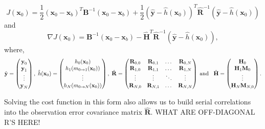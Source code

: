 \documentclass[11pt]{article}
\begin{document}
\begin{equation}
J(\textbf{x}_0) = \frac{1}{2}(\textbf{x}_0-\textbf{x}_b)^{T}\textbf{B}^{-1}(\textbf{x}_0-\textbf{x}_b)+\frac{1}{2}(\hat{\textbf{y}}-\hat{h}(\textbf{x}_0))^{T}\hat{\textbf{R}}^{-1}(\hat{\textbf{y}}-\hat{h}(\textbf{x}_0)) \label{costfn}
\end{equation}
and
\begin{equation}
\nabla J(\textbf{x}_0) = \textbf{B}^{-1}(\textbf{x}_0-\textbf{x}_b)-\hat{\mathbf{H}}^{T}\hat{\textbf{R}}^{-1}(\hat{\textbf{y}}-\hat{h}(\textbf{x}_0)), \label{gradcostfn}
\end{equation}
where,
\begin{equation}
\hat{\textbf{y}}=
\begin{pmatrix}
\textbf{y}_0 \\
\textbf{y}_1\\
\vdots \\
\textbf{y}_N
\end{pmatrix},
\hspace{1mm}
\hat{h}(\textbf{x}_0)=
\begin{pmatrix}
h_0(\textbf{x}_0) \\
h_1(m_{0\rightarrow 1}(\mathbf{x}_{0}))\\
\vdots \\
h_N(m_{0\rightarrow N}(\mathbf{x}_{0}))
\end{pmatrix},
\hspace{1mm}
\hat{\mathbf{R}}=
\begin{pmatrix}
\mathbf{R}_{0, 0} & \mathbf{R}_{0, 1} & \dots & \mathbf{R}_{0, N} \\
\mathbf{R}_{1, 0} & \mathbf{R}_{1, 1} & \dots & \mathbf{R}_{1, N} \\
\vdots & \vdots & \ddots & \vdots \\
\mathbf{R}_{N, 0} & \mathbf{R}_{N, 1} & \dots & \mathbf{R}_{N, N}
\end{pmatrix}
\hspace{1mm} \text{and} \hspace{3mm}
\hat{\mathbf{H}}=
\begin{pmatrix}
\mathbf{H}_0 \\
\mathbf{H}_1\mathbf{M}_0\\
\vdots \\
\mathbf{H}_N\mathbf{M}_{N,0}
\end{pmatrix}.
\end{equation}

Solving the cost function in this form also allows us to build serial correlations into the observation error covariance matrix $\hat{\mathbf{R}}$. WHAT ARE OFF-DIAGONAL R'S HERE!
\end{document}
